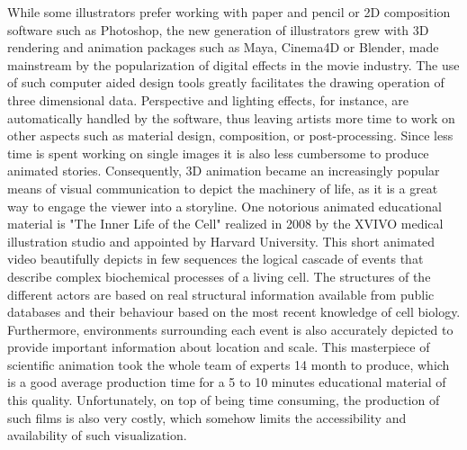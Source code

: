 While some illustrators prefer working with paper and pencil or 2D composition software such as Photoshop, the new generation of illustrators grew with 3D rendering and animation packages such as Maya, Cinema4D or Blender, made mainstream by the popularization of digital effects in the movie industry.
The use of such computer aided design tools greatly facilitates the drawing operation of three dimensional data.
Perspective and lighting effects, for instance, are automatically handled by the software, thus leaving artists more time to work on other aspects such as material design, composition, or post-processing.
Since less time is spent working on single images it is also less cumbersome to produce animated stories.
Consequently, 3D animation  became an increasingly popular means of visual communication to depict the machinery of life, as it is a great way to engage the viewer into a storyline.
One notorious animated educational material is "The Inner Life of the Cell" realized in 2008 by the XVIVO medical illustration studio and appointed by Harvard University.
This short animated video beautifully depicts in few sequences the logical cascade of events that describe complex biochemical processes of a living cell.
The structures of the different actors are based on real structural information available from public databases and their behaviour based on the most recent knowledge of cell biology.
Furthermore, environments surrounding each event is also accurately depicted to provide important information about location and scale.
This masterpiece of scientific animation took the whole team of experts 14 month to produce, which is a good average production time for a 5 to 10 minutes educational material of this quality.
Unfortunately, on top of being time consuming, the production of such films is also very costly, which somehow limits the accessibility and availability of such visualization.


